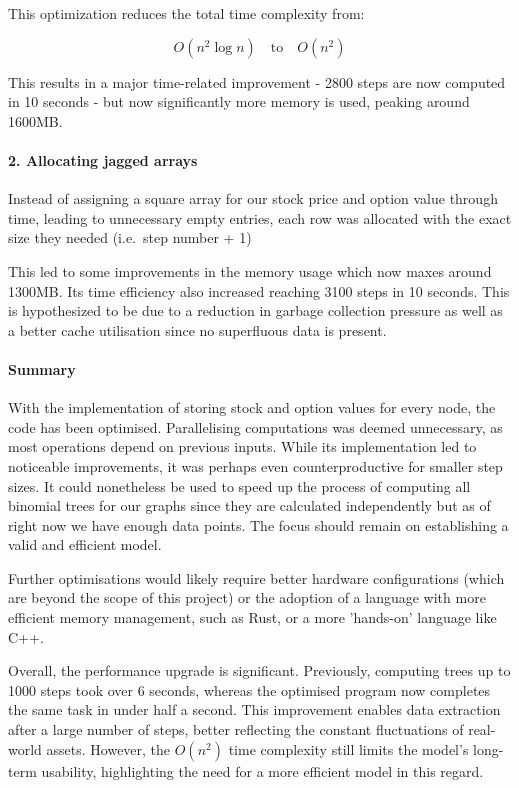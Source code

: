 \documentclass{article}
\begin{document}
    This optimization reduces the total time complexity from:

    \[
        O(n^2 \log n) \quad \text{to} \quad O(n^2)
    \]

    This results in a major time-related improvement - 2800 steps are now computed in 10 seconds - but now significantly more memory is used, peaking around 1600MB.

    \paragraph{2. Allocating jagged arrays}
    Instead of assigning a square array for our stock price and option value through time, leading to unnecessary empty entries, each row was allocated with the exact size they needed (i.e.\ step number + 1)


    This led to some improvements in the memory usage which now maxes around 1300MB. Its time efficiency also increased reaching 3100 steps in 10 seconds.
    This is hypothesized to be due to a reduction in garbage collection pressure as well as a better cache utilisation since no superfluous data is present.

    \paragraph{Summary}

    With the implementation of storing stock and option values for every node, the code has been optimised.
    Parallelising computations was deemed unnecessary, as most operations depend on previous inputs. While its implementation led to noticeable improvements, it was perhaps even counterproductive for smaller step sizes.
    It could nonetheless be used to speed up the process of computing all binomial trees for our graphs since they are calculated independently but as of right now we have enough data points.
    The focus should remain on establishing a valid and efficient model.

    \medskip

    Further optimisations would likely require better hardware configurations (which are beyond the scope of this project) or the adoption of a language with more efficient memory management, such as Rust, or a more 'hands-on' language like C++.

    \medskip

    Overall, the performance upgrade is significant. Previously, computing trees up to 1000 steps took over 6 seconds, whereas the optimised program now completes the same task in under half a second. This improvement enables data extraction after a large number of steps, better reflecting the constant fluctuations of real-world assets. However, the \( O(n^2) \) time complexity still limits the model's long-term usability, highlighting the need for a more efficient model in this regard.
\end{document}
